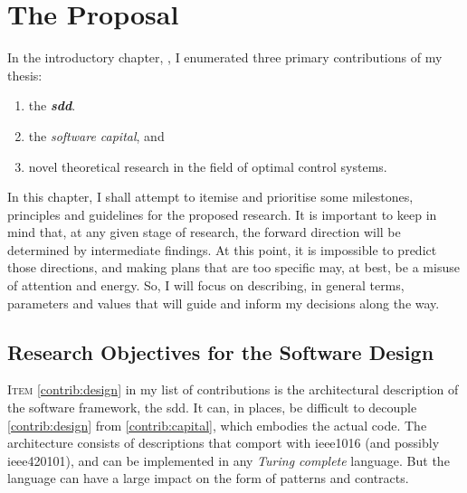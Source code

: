 %
\chapter{The Proposal}%
\label{chap:proposal}


In the introductory chapter, , I enumerated three
primary contributions of my thesis:
%
%
\begin{enumerate}[label=(C\arabic*)]
  \item the \textbf{\textit{\acl{sdd}}}. \label{contrib:design}
  \item the \emph{software capital}, and \label{contrib:capital}
  \item novel theoretical research in the field of optimal control
  systems.\label{contrib:theory}
\end{enumerate}
In this chapter, I shall attempt to itemise and prioritise some milestones,
principles and guidelines for the proposed research. It is important to keep in
mind that, at any given stage of research, the forward direction will be
determined by intermediate findings. At this point, it is impossible to predict
those directions, and making plans that are too specific may, at best, be a
misuse of attention and energy. So, I will focus on describing, in general
terms, parameters and values that will guide and inform my decisions along the
way.



\section{Research Objectives for the Software Design}


\textsc{Item} \ref{contrib:design} in my list of contributions is the
architectural description of the software framework, the \ac{sdd}. It can, in
places, be difficult to decouple \ref{contrib:design} from
\ref{contrib:capital}, which embodies the actual code. The architecture consists
of descriptions that comport with \acl{ieee1016} (and possibly
\acl{ieee420101}), and can be implemented in any \emph{Turing complete}
language. But the language can have a large impact on the form of patterns and
contracts.


